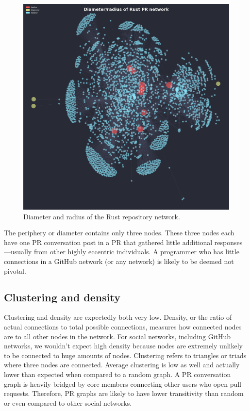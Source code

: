 \documentclass[12pt, a4paper]{article}
\begin{document}
\begin{figure}[ht!]
    \includegraphics[width=\linewidth]{network_diarad.png}
    \caption{Diameter and radius of the Rust repository network.}
    \label{fig:diarad}
\end{figure}

The periphery or diameter contains only three nodes. These three nodes each have one PR conversation post in a PR that gathered little additional responses---usually from other highly eccentric individuals. A programmer who has little connections in a GitHub network (or any network) is likely to be deemed not pivotal.

\subsection{Clustering and density}
Clustering and density are expectedly both very low. Density, or the ratio of actual connections to total possible connections, measures how connected nodes are to all other nodes in the network. For social networks, including GitHub networks, we wouldn't expect high density because nodes are extremely unlikely to be connected to huge amounts of nodes. Clustering refers to triangles or triads where three nodes are connected. Average clustering is low as well and actually lower than expected when compared to a random graph. A PR conversation graph is heavily bridged by core members connecting other users who open pull requests. Therefore, PR graphs are likely to have lower transitivity than random or even compared to other social networks.
\end{document}
